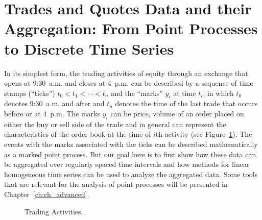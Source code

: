 \section{Trades and Quotes Data and their Aggregation: From Point Processes to Discrete Time Series \label{sec:tradesandquotes}}

In its simplest form, the trading activities of equity through an exchange that opens at 9:30~a.m. and closes at 4~p.m. can be described by a sequence of time stamps (``ticks'') $t_0 < t_1 < \cdots < t_n$ and the ``marks'' $y_i$ at time $t_i$, in which $t_0$ denotes 9:30~a.m. and after and $t_n$ denotes the time of the last trade that occurs before or at 4~p.m. The marks $y_i$ can be price, volume of an order placed on either the buy or sell side of the trade and in general can represent the characteristics of the order book at the time of $i$th activity (see Figure~\ref{fig:tradeactline}). The events with the marks associated with the ticks can be described mathematically as a marked point process. But our goal here is to first show how these data can be aggregated over regularly spaced time intervals and how methods for linear homogeneous time series can be used to analyze the aggregated data. Some tools that are relevant for the analysis of point processes will be presented in Chapter~\ref{ch:ch_advanced}.	
	\begin{figure}[!ht]
	\centering
	\caption{Trading Activities. \label{fig:tradeactline}}
	\end{figure}


